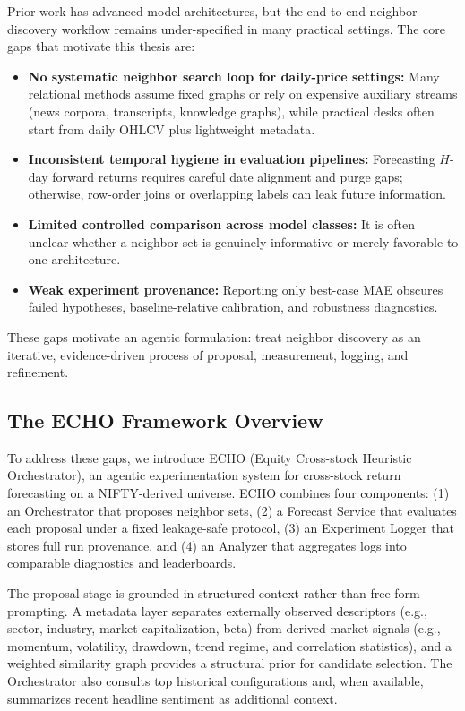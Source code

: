 \documentclass[12pt,a4paper,titlepage]{article}
\begin{document}
Prior work has advanced model architectures, but the end-to-end neighbor-discovery workflow remains under-specified in many practical settings. The core gaps that motivate this thesis are:

\begin{itemize}
    \item \textbf{No systematic neighbor search loop for daily-price settings:} Many relational methods assume fixed graphs or rely on expensive auxiliary streams (news corpora, transcripts, knowledge graphs), while practical desks often start from daily OHLCV plus lightweight metadata.
    \item \textbf{Inconsistent temporal hygiene in evaluation pipelines:} Forecasting \(H\)-day forward returns requires careful date alignment and purge gaps; otherwise, row-order joins or overlapping labels can leak future information.
    \item \textbf{Limited controlled comparison across model classes:} It is often unclear whether a neighbor set is genuinely informative or merely favorable to one architecture.
    \item \textbf{Weak experiment provenance:} Reporting only best-case MAE obscures failed hypotheses, baseline-relative calibration, and robustness diagnostics.
\end{itemize}

These gaps motivate an agentic formulation: treat neighbor discovery as an iterative, evidence-driven process of proposal, measurement, logging, and refinement.

\subsection{The ECHO Framework Overview}

To address these gaps, we introduce ECHO (Equity Cross-stock Heuristic Orchestrator), an agentic experimentation system for cross-stock return forecasting on a NIFTY-derived universe. ECHO combines four components: (1) an Orchestrator that proposes neighbor sets, (2) a Forecast Service that evaluates each proposal under a fixed leakage-safe protocol, (3) an Experiment Logger that stores full run provenance, and (4) an Analyzer that aggregates logs into comparable diagnostics and leaderboards.

The proposal stage is grounded in structured context rather than free-form prompting. A metadata layer separates externally observed descriptors (e.g., sector, industry, market capitalization, beta) from derived market signals (e.g., momentum, volatility, drawdown, trend regime, and correlation statistics), and a weighted similarity graph provides a structural prior for candidate selection. The Orchestrator also consults top historical configurations and, when available, summarizes recent headline sentiment as additional context.
\end{document}
